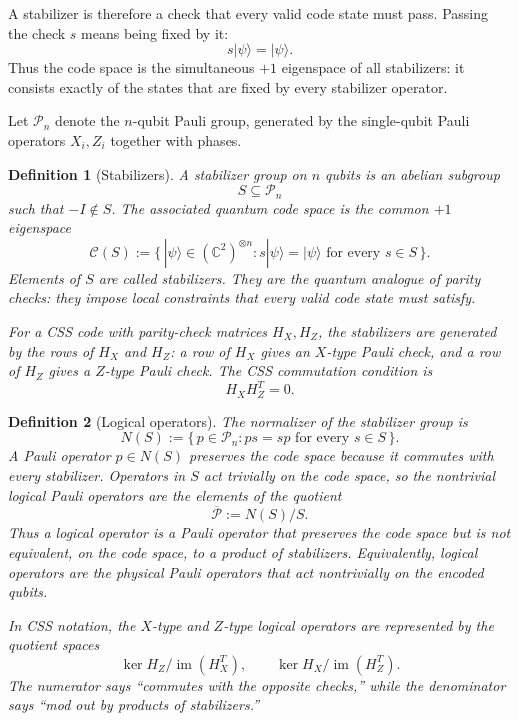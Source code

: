 \documentclass[10pt]{article}
\theoremstyle{compactdef}
\newtheorem{definition}{Definition}
\begin{document}
A stabilizer is therefore a check that every valid code state must pass. Passing the check $s$ means being fixed by it:
\[
s|\psi\rangle=|\psi\rangle.
\]
Thus the code space is the simultaneous $+1$ eigenspace of all stabilizers: it consists exactly of the states that are fixed by every stabilizer operator.

Let $\mathcal P_n$ denote the $n$-qubit Pauli group, generated by the single-qubit Pauli operators $X_i,Z_i$ together with phases.

\begin{definition}[Stabilizers]
A \emph{stabilizer group} on $n$ qubits is an abelian subgroup
\[
S\subseteq \mathcal P_n
\]
such that $-I\notin S$. The associated quantum code space is the common $+1$ eigenspace
\[
\mathcal C(S):=
\{\,|\psi\rangle\in (\mathbb C^2)^{\otimes n}:
 s|\psi\rangle=|\psi\rangle\text{ for every }s\in S\,\}.
\]
Elements of $S$ are called \emph{stabilizers}. They are the quantum analogue of parity checks: they impose local constraints that every valid code state must satisfy.

For a CSS code with parity-check matrices $H_X,H_Z$, the stabilizers are generated by the rows of $H_X$ and $H_Z$: a row of $H_X$ gives an $X$-type Pauli check, and a row of $H_Z$ gives a $Z$-type Pauli check. The CSS commutation condition is
\[
H_XH_Z^T=0.
\]
\end{definition}

\begin{definition}[Logical operators]
The \emph{normalizer} of the stabilizer group is
\[
N(S):=
\{\,p\in \mathcal P_n: ps=sp\text{ for every }s\in S\,\}.
\]
A Pauli operator $p\in N(S)$ preserves the code space because it commutes with every stabilizer. Operators in $S$ act trivially on the code space, so the nontrivial logical Pauli operators are the elements of the quotient
\[
\overline{\mathcal P}:=N(S)/S.
\]
Thus a \emph{logical operator} is a Pauli operator that preserves the code space but is not equivalent, on the code space, to a product of stabilizers. Equivalently, logical operators are the physical Pauli operators that act nontrivially on the encoded qubits.

In CSS notation, the $X$-type and $Z$-type logical operators are represented by the quotient spaces
\[
\ker H_Z\big/\operatorname{im}(H_X^T),
\qquad
\ker H_X\big/\operatorname{im}(H_Z^T).
\]
The numerator says ``commutes with the opposite checks,'' while the denominator says ``mod out by products of stabilizers.''
\end{definition}
\end{document}
